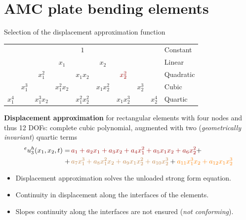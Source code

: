 \documentclass[aspectratio=169]{beamer}
\begin{document}
\section{AMC plate bending elements}

\begin{frame}{Selection of the displacement approximation function}
  \begin{center}
    \begin{tabular}{ccccccccc|l}
              &                      &                          &                         & \color{darkred}$1$      &                         &                          &                      &         & Constant  \\
              &                      &                          & \color{darkred}$x_1$    &                         & \color{darkred}$x_2$    &                          &                      &         & Linear    \\
              &                      & \color{darkred}$x_1^2$   &                         & \color{darkred}$x_1x_2$ &                         & $\color{darkred}x_2^2$   &                      &         & Quadratic \\
              & \color{brown}$x_1^3$ &                          & \color{brown}$x_1^2x_2$ &                         & \color{brown}$x_1x_2^2$ &                          & \color{brown}$x_2^3$ &         & Cubic     \\
      $x_1^4$ &                      & \color{orange}$x_1^3x_2$ &                         & $x_1^2x_2^2$            &                         & \color{orange}$x_1x_2^3$ &                      & $x_2^4$ & Quartic   \\
    \end{tabular}
  \end{center}
  \begin{block}{}
    \textbf{Displacement approximation} for rectangular elements with four nodes and thus 12 DOFs: complete cubic polynomial, augmented with two (\emph{geometrically invariant}) quartic terms
    \vspace{-0.2cm}
    \begin{align*}
      {}^eu_3^h(x_1,x_2,t) = & \, {\color{darkred}a_1 + a_2 x_1 + a_3 x_2 + a_4 x_1^2 + a_5 x_1 x_2 + a_6 x_2^2} +                                              \\
      +                      & \,{\color{brown} a_7 x_1^3 + a_8 x_1^2 x_2 + a_9 x_1 x_2^2 + a_{10} x_2^3} + {\color{orange}a_{11} x_1^3 x_2 + a_{12} x_1 x_2^3}
    \end{align*}
  \end{block}
  \begin{itemize}
    \item[\Checkmark] Displacement approximation solves the unloaded strong form equation.
    \item[\Checkmark] Continuity in displacement along the interfaces of the elements.
    \item[\XSolidBrush] Slopes continuity along the interfaces are not ensured (\emph{not conforming}).
  \end{itemize}
\end{frame}
\end{document}
